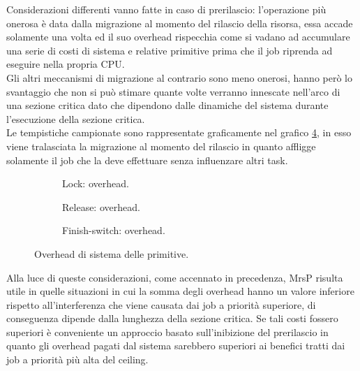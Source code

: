 {\noindent Considerazioni differenti vanno fatte in caso di prerilascio: l'operazione più onerosa è data dalla migrazione al momento del rilascio della risorsa, essa accade solamente una volta ed il suo overhead rispecchia come si vadano ad accumulare una serie di costi di sistema e relative primitive prima che il job riprenda ad eseguire nella propria CPU.\\

\noindent Gli altri meccanismi di migrazione al contrario sono meno onerosi, hanno però lo svantaggio che non si può stimare quante volte verranno innescate nell'arco di una sezione critica dato che dipendono dalle dinamiche del sistema durante l'esecuzione della sezione critica.\\

\noindent Le tempistiche campionate sono rappresentate graficamente nel grafico \ref{fig:overheads}, in esso viene tralasciata la migrazione al momento del rilascio in quanto affligge solamente il job che la deve effettuare senza influenzare altri task.\\

  \begin{figure}
    \centering
      \begin{subfigure}[b]{0.49\textwidth}
        \centering
        \resizebox{\linewidth}{!}\overheadsLock
        \caption{Lock: overhead.}
        \label{fig:overheadsLock}
      \end{subfigure}
      \begin{subfigure}[b]{0.36\textwidth}
        \centering
        \resizebox{\linewidth}{!}\overheadsRelease
        \caption{Release: overhead.}
        \label{fig:overheadsUnlock}
      \end{subfigure}
      \begin{subfigure}[b]{0.49\textwidth}
        \centering
        \resizebox{\linewidth}{!}\overheadsFS
        \caption{Finish-switch: overhead.}
        \label{fig:overheadsFS}
      \end{subfigure}
    \caption{Overhead di sistema delle primitive.}
    \label{fig:overheads}
  \end{figure}

\noindent Alla luce di queste considerazioni, come accennato in precedenza, MrsP risulta utile in quelle situazioni in cui la somma degli overhead hanno un valore inferiore rispetto all'interferenza che viene causata dai job a priorità superiore, di conseguenza dipende dalla lunghezza della sezione critica. Se tali costi fossero superiori è conveniente un approccio basato sull'inibizione del prerilascio in quanto gli overhead pagati dal sistema sarebbero superiori ai benefici tratti dai job a priorità più alta del ceiling.

}
